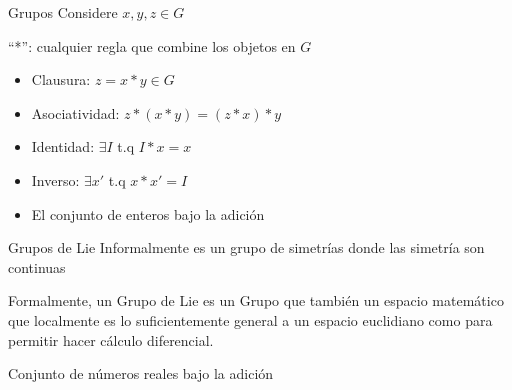 \documentclass[%
xcolor=pdftex,dvipsnames,table%
]{beamer}
\begin{document}
\begin{frame}
  \begin{block}{Grupos}
    Considere $x,y,z\in G$ 

    ``*'': cualquier regla que combine los objetos en $G$
    \begin{itemize}
    \item Clausura: $z=x*y\in G$
    \item Asociatividad: $z*(x*y)=(z*x)*y$
    \item Identidad: $\exists I$ t.q $I*x=x$
    \item Inverso: $\exists x'$ t.q $x*x'=I$
    \end{itemize}
  \end{block}
  \begin{example}
    \begin{itemize}
    \item El conjunto de enteros bajo la adición
    \end{itemize}
  \end{example}
\end{frame}
\begin{frame}[plain]
  \begin{block}{Grupos de Lie}
    Informalmente es un grupo de simetrías donde las simetría son continuas

    Formalmente, un Grupo de Lie es un Grupo que también un espacio matemático que localmente es lo suficientemente general a un espacio euclidiano como para permitir hacer cálculo diferencial.
  \end{block}
  \begin{example}
    Conjunto de números reales bajo la adición
  \end{example}
\end{frame}

\end{document}
